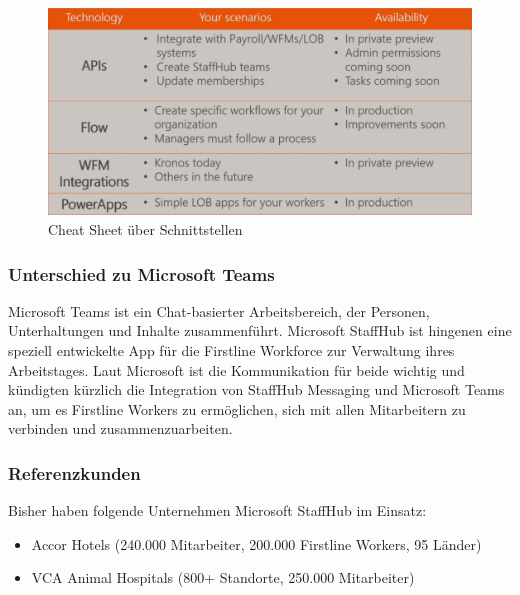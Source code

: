 \begin{figure}[H] 
\centering 
\includegraphics[scale=0.42]{images/msapi} 
\caption[Cheat Sheet über Schnittstellen]{Cheat Sheet über Schnittstellen\protect} 
\label{ws} 
\end{figure}

\subsubsection{Unterschied zu Microsoft Teams}
Microsoft Teams ist ein Chat-basierter Arbeitsbereich, der Personen, Unterhaltungen und Inhalte zusammenführt. Microsoft StaffHub ist hingenen eine speziell entwickelte App für die Firstline Workforce zur Verwaltung ihres Arbeitstages. Laut Microsoft ist die Kommunikation für beide wichtig und kündigten kürzlich die Integration von StaffHub Messaging und Microsoft Teams an, um es Firstline Workers zu ermöglichen, sich mit allen Mitarbeitern zu verbinden und zusammenzuarbeiten.

\subsubsection{Referenzkunden}
Bisher haben folgende Unternehmen Microsoft StaffHub im Einsatz: 

\begin{itemize}
\item Accor Hotels (240.000 Mitarbeiter, 200.000 Firstline Workers, 95 Länder)
\item VCA Animal Hospitals (800+ Standorte, 250.000 Mitarbeiter)
\end{itemize}
 
